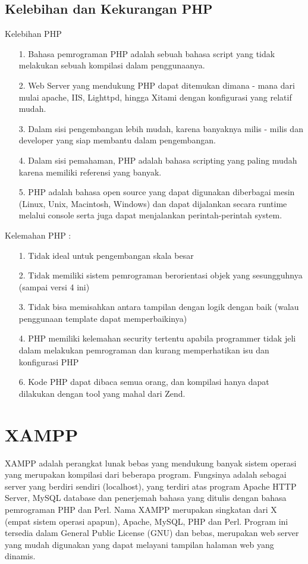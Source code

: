 \documentclass{jtetiproposalskripsi}
\begin{document}
\subsection{Kelebihan dan Kekurangan PHP}
Kelebihan PHP
\begin{itemize}
\item[1.]Bahasa pemrograman PHP adalah sebuah bahasa script yang tidak melakukan sebuah kompilasi dalam 			 penggunaanya.
\item[2.]Web Server yang mendukung PHP dapat ditemukan dimana - mana dari mulai apache, IIS, Lighttpd, 		         hingga Xitami dengan konfigurasi yang relatif mudah.
\item[3.]Dalam sisi pengembangan lebih mudah, karena banyaknya milis -  milis dan developer yang siap 			     membantu dalam pengembangan.
\item[4.]Dalam sisi pemahaman, PHP adalah bahasa scripting yang paling mudah karena memiliki referensi 	   	     yang banyak.
\item[5.]PHP adalah bahasa open source yang dapat digunakan diberbagai mesin (Linux, Unix, Macintosh, 	  			 Windows) dan dapat dijalankan secara runtime melalui console serta juga dapat menjalankan 	  			     perintah-perintah system.
\end{itemize} 
	
Kelemahan PHP :
\begin{itemize}
\item[1.]Tidak ideal untuk pengembangan skala besar
\item[2.]Tidak memiliki sistem pemrograman berorientasi objek yang sesungguhnya (sampai versi 4 ini)
\item[3.]Tidak bisa memisahkan antara tampilan dengan logik dengan baik (walau penggunaan template dapat 			 memperbaikinya)
\item[4.]PHP memiliki kelemahan security tertentu apabila programmer tidak jeli dalam melakukan 		  	         pemrograman dan kurang memperhatikan isu dan konfigurasi PHP
\item[6.]Kode PHP dapat dibaca semua orang, dan kompilasi hanya dapat dilakukan dengan tool yang mahal 	   	     dari Zend.
\end{itemize}

\section{XAMPP}
			XAMPP adalah perangkat lunak bebas yang mendukung banyak sistem operasi yang merupakan kompilasi dari beberapa program. Fungsinya adalah sebagai server yang berdiri sendiri (localhost), yang terdiri atas program Apache HTTP Server, MySQL database dan penerjemah bahasa yang ditulis dengan bahasa pemrograman PHP dan Perl.
Nama XAMPP merupakan singkatan dari X (empat sistem operasi apapun), Apache, MySQL, PHP dan Perl. Program ini tersedia dalam General Public License (GNU) dan bebas, merupakan web server yang mudah digunakan yang dapat melayani tampilan halaman web yang dinamis.  
\end{document}
